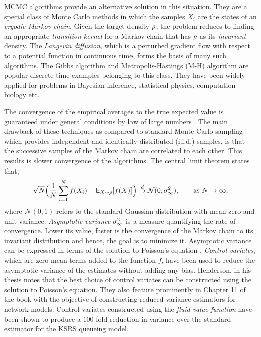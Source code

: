 MCMC algorithms provide an alternative solution in this situation. They are a special class of Monte Carlo methods in which the samples $X_i$ are the states of an \textit{ergodic Markov chain}. Given the target density $\rho$, the problem reduces to finding an appropriate \textit{transition kernel} for a Markov chain that has $\rho$ as its \textit{invariant} density. The \textit{Langevin diffusion}, which is a perturbed gradient flow with respect to a potential function in continuous time, forms the basis of many such algorithms. The Gibbs algorithm \cite{tanwon87} and Metropolis-Hastings (M-H)  algorithm \cite{has70} are popular discrete-time examples belonging to this class. They have been widely applied for problems in Bayesian inference, statistical physics, computation biology etc.

The convergence of the empirical averages to the true expected value is guaranteed under general conditions by law of large numbers \cite{}. The main drawback of these techniques as compared to standard Monte Carlo sampling which provides independent and identically distributed (i.i.d.) samples, is that the successive samples of the Markov chain are correlated to each other. This results is slower convergence of the algorithms. The central limit theorem states that,
\[
\sqrt{N} \Bigl(\frac{1}{N} \sum_{i=1}^N f(X_i) - {\sf E}_{X \sim \rho} [f(X)] \Bigr) \overset{d}{\to} \mathcal{N}(0, \sigma_\infty^2),\qquad \text{as } N \to \infty, 
\]
where $\mathcal{N}(0,1)$ refers to the standard Gaussian distribution with mean zero and unit variance. \textit{Asymptotic variance} $\sigma_\infty^2$ is a measure quantifying the rate of convergence. Lower its value, faster is the convergence of the Markov chain to its invariant distribution and hence, the goal is to minimize it. Asymptotic variance can be expressed in terms of the solution to Poisson's equation \cite{ctcn}. \textit{Control variates}, which are zero-mean terms added to the function $f$, have been used to reduce the asymptotic variance of the estimates without adding any bias. Henderson, in his thesis \cite{henthesis97} notes that the best choice of control variates can be constructed using the solution to Poisson's equation. They also feature prominently in Chapter 11 of the book \cite{ctcn} with the objective of constructing reduced-variance estimators for network models. Control variates constructed using the \textit{fluid value function} have been shown to produce a $100$-fold reduction in variance over the standard estimator for the KSRS queueing model. 

